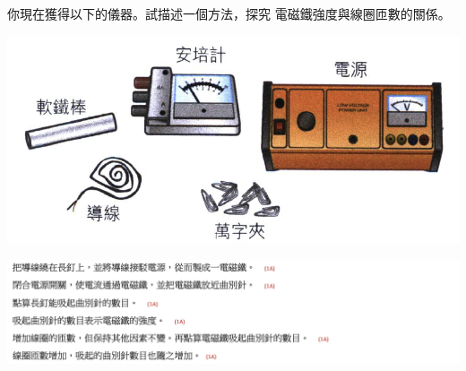 {
    你現在獲得以下的儀器。試描述一個方法，探究 電磁鐵強度與線圈匝數的關係。 
    \par{\par\centering\includegraphics[width=.5\textwidth]{./img/ch4_magnetostatics_lq_2024-06-23-21-12-36.png}\par}
}{\par{\par\centering\includegraphics[width=\textwidth]{./img/ch4_magnetostatics_lq_2024-06-23-21-18-19.png}\par}}

